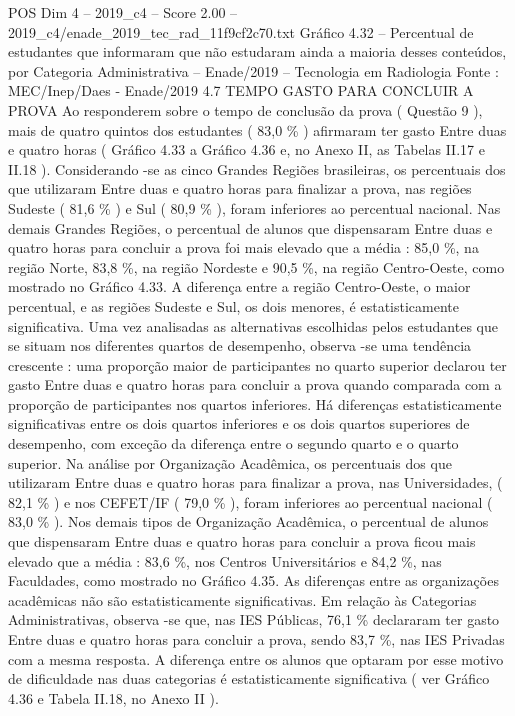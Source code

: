 \begin{textsample}{POS Dim 4 – 2019\_c4 – Score 2.00 – 2019\_c4/enade\_2019\_tec\_rad\_11f9cf2c70.txt}
Gráfico 4.32 – Percentual de estudantes que informaram que não estudaram ainda a maioria desses conteúdos, por Categoria Administrativa – Enade/2019 – Tecnologia em Radiologia Fonte : MEC/Inep/Daes - Enade/2019 4.7 TEMPO GASTO PARA CONCLUIR A PROVA Ao responderem sobre o tempo de conclusão da prova ( Questão 9 ), mais de quatro quintos dos estudantes ( 83,0 \% ) afirmaram ter gasto Entre duas e quatro horas ( Gráfico 4.33 a Gráfico 4.36 e, no Anexo II, as Tabelas II.17 e II.18 ).
Considerando -se as cinco Grandes Regiões brasileiras, os percentuais dos que utilizaram Entre duas e quatro horas para finalizar a prova, nas regiões Sudeste ( 81,6 \% ) e Sul ( 80,9 \% ), foram inferiores ao percentual nacional.
Nas demais Grandes Regiões, o percentual de alunos que dispensaram Entre duas e quatro horas para concluir a prova foi mais elevado que a média : 85,0 \%, na região Norte, 83,8 \%, na região Nordeste e 90,5 \%, na região Centro-Oeste, como mostrado no Gráfico 4.33.
A diferença entre a região Centro-Oeste, o maior percentual, e as regiões Sudeste e Sul, os dois menores, é estatisticamente significativa.
Uma vez analisadas as alternativas escolhidas pelos estudantes que se situam nos diferentes quartos de desempenho, observa -se uma tendência crescente : uma proporção maior de participantes no quarto superior declarou ter gasto Entre duas e quatro horas para concluir a prova quando comparada com a proporção de participantes nos quartos inferiores.
Há diferenças estatisticamente significativas entre os dois quartos inferiores e os dois quartos superiores de desempenho, com exceção da diferença entre o segundo quarto e o quarto superior.
Na análise por Organização Acadêmica, os percentuais dos que utilizaram Entre duas e quatro horas para finalizar a prova, nas Universidades, ( 82,1 \% ) e nos CEFET/IF ( 79,0 \% ), foram inferiores ao percentual nacional ( 83,0 \% ).
Nos demais tipos de Organização Acadêmica, o percentual de alunos que dispensaram Entre duas e quatro horas para concluir a prova ficou mais elevado que a média : 83,6 \%, nos Centros Universitários e 84,2 \%, nas Faculdades, como mostrado no Gráfico 4.35.
As diferenças entre as organizações acadêmicas não são estatisticamente significativas.
Em relação às Categorias Administrativas, observa -se que, nas IES Públicas, 76,1 \% declararam ter gasto Entre duas e quatro horas para concluir a prova, sendo 83,7 \%, nas IES Privadas com a mesma resposta.
A diferença entre os alunos que optaram por esse motivo de dificuldade nas duas categorias é estatisticamente significativa ( ver Gráfico 4.36 e Tabela II.18, no Anexo II ).

\end{textsample}
